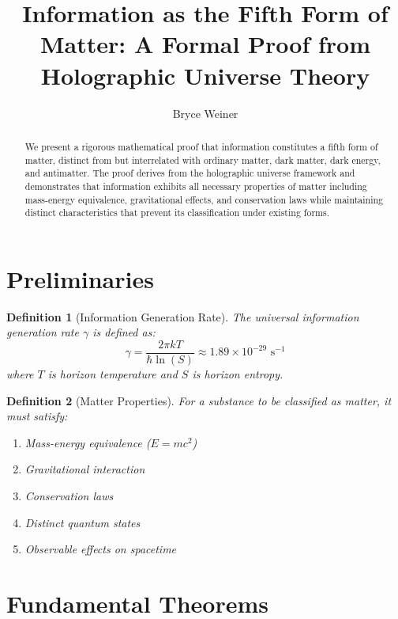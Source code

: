 \documentclass{article}
\newtheorem{definition}{Definition}
\begin{document}
\title{Information as the Fifth Form of Matter: A Formal Proof from Holographic Universe Theory}
\author{Bryce Weiner}
\maketitle

\begin{abstract}
We present a rigorous mathematical proof that information constitutes a fifth form of matter, distinct from but interrelated with ordinary matter, dark matter, dark energy, and antimatter. The proof derives from the holographic universe framework and demonstrates that information exhibits all necessary properties of matter including mass-energy equivalence, gravitational effects, and conservation laws while maintaining distinct characteristics that prevent its classification under existing forms.
\end{abstract}

\section{Preliminaries}

\begin{definition}[Information Generation Rate]
The universal information generation rate $\gamma$ is defined as:
\begin{equation}
\gamma = \frac{2\pi kT}{\hbar \ln(S)} \approx 1.89 \times 10^{-29} \text{ s}^{-1}
\end{equation}
where $T$ is horizon temperature and $S$ is horizon entropy.
\end{definition}

\begin{definition}[Matter Properties]
For a substance to be classified as matter, it must satisfy:
\begin{enumerate}
    \item Mass-energy equivalence ($E = mc^2$)
    \item Gravitational interaction
    \item Conservation laws
    \item Distinct quantum states
    \item Observable effects on spacetime
\end{enumerate}
\end{definition}

\section{Fundamental Theorems}
\end{document}
